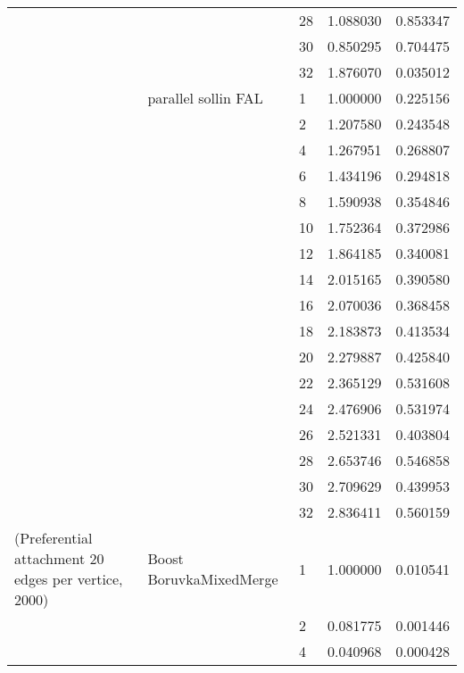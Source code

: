 \begin{tabular}{lllrr}
                      &                     & 28 &  1.088030 &  0.853347 \\
                      &                     & 30 &  0.850295 &  0.704475 \\
                      &                     & 32 &  1.876070 &  0.035012 \\
                      & parallel sollin FAL & 1  &  1.000000 &  0.225156 \\
                      &                     & 2  &  1.207580 &  0.243548 \\
                      &                     & 4  &  1.267951 &  0.268807 \\
                      &                     & 6  &  1.434196 &  0.294818 \\
                      &                     & 8  &  1.590938 &  0.354846 \\
                      &                     & 10 &  1.752364 &  0.372986 \\
                      &                     & 12 &  1.864185 &  0.340081 \\
                      &                     & 14 &  2.015165 &  0.390580 \\
                      &                     & 16 &  2.070036 &  0.368458 \\
                      &                     & 18 &  2.183873 &  0.413534 \\
                      &                     & 20 &  2.279887 &  0.425840 \\
                      &                     & 22 &  2.365129 &  0.531608 \\
                      &                     & 24 &  2.476906 &  0.531974 \\
                      &                     & 26 &  2.521331 &  0.403804 \\
                      &                     & 28 &  2.653746 &  0.546858 \\
                      &                     & 30 &  2.709629 &  0.439953 \\
                      &                     & 32 &  2.836411 &  0.560159 \\
(Preferential attachment 20 edges per vertice, 2000) & Boost BoruvkaMixedMerge & 1  &  1.000000 &  0.010541 \\
                      &                     & 2  &  0.081775 &  0.001446 \\
                      &                     & 4  &  0.040968 &  0.000428 \\

\end{tabular}

